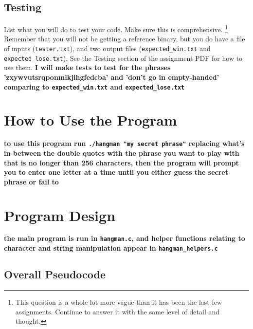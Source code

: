 \documentclass{article}
\begin{document}
\subsection{Testing}
List what you will do to test your code. Make sure this is comprehensive. \footnote{This question is a whole lot more vague than it has been the last few assignments. Continue to answer it with the same level of detail and thought.} Remember that you will not be getting a reference binary,
but you do have a file of inputs (\texttt{tester.txt}), and two output files (\texttt{expected_win.txt} and \texttt{expected_lose.txt}).
See the Testing section of the assignment PDF for how to use them. \textbf{I will make tests to test for the phrases 'zxywvutsrqponmlkjihgfedcba' and 'don't go in empty-handed' comparing to \texttt{expected_win.txt} and \texttt{expected_lose.txt}}


\section{How to Use the Program}

\textbf{to use this program run \lstinline{./hangman "my secret phrase"} replacing what's in between the double quotes with the phrase you want to play with that is no longer than 256 characters, then the program will prompt you to enter one letter at a time until you either guess the secret phrase or fail to}

\section{Program Design}

\textbf{the main program is run in \lstinline{hangman.c}, and helper functions relating to character and string manipulation appear in \lstinline{hangman_helpers.c}}

\subsection{Overall Pseudocode}
\end{document}
